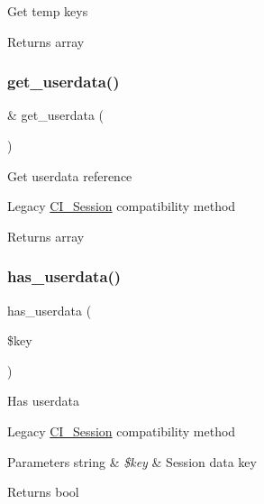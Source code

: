 Get temp keys

\begin{DoxyReturn}{Returns}
array 
\end{DoxyReturn}
\mbox{\label{class_c_i___session_a85456fcd9f556e20767051fc33762607}} 
\subsubsection{\texorpdfstring{get\+\_\+userdata()}{get\_userdata()}}
{\footnotesize\ttfamily \& get\+\_\+userdata (\begin{DoxyParamCaption}{ }\end{DoxyParamCaption})}

Get userdata reference

Legacy \mbox{\hyperlink{class_c_i___session}{C\+I\+\_\+\+Session}} compatibility method

\begin{DoxyReturn}{Returns}
array 
\end{DoxyReturn}
\mbox{\label{class_c_i___session_a25f39652bb0f716817e5e1e778729bea}} 
\subsubsection{\texorpdfstring{has\+\_\+userdata()}{has\_userdata()}}
{\footnotesize\ttfamily has\+\_\+userdata (\begin{DoxyParamCaption}\item[{}]{\$key }\end{DoxyParamCaption})}

Has userdata

Legacy \mbox{\hyperlink{class_c_i___session}{C\+I\+\_\+\+Session}} compatibility method


\begin{DoxyParams}[1]{Parameters}
string & {\em \$key} & Session data key \\
\hline
\end{DoxyParams}
\begin{DoxyReturn}{Returns}
bool 
\end{DoxyReturn}
\mbox{\label{class_c_i___session_a1e25514ba8dbd132db06cbedc6412158}} 
